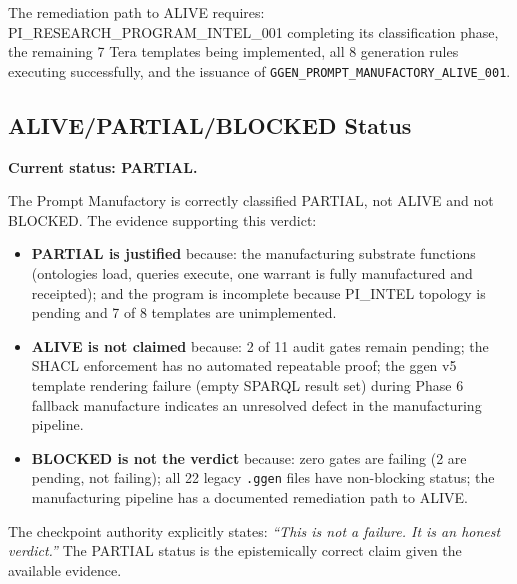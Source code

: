 The remediation path to ALIVE requires: PI\_RESEARCH\_PROGRAM\_INTEL\_001 completing
its classification phase, the remaining 7 Tera templates being implemented, all 8
generation rules executing successfully, and the issuance of
\texttt{GGEN\_PROMPT\_MANUFACTORY\_ALIVE\_001}.

\subsection{ALIVE/PARTIAL/BLOCKED Status}
\label{sec:research-prompt-manufactory-evidence-status}

\textbf{Current status: PARTIAL.}

The Prompt Manufactory is correctly classified PARTIAL, not ALIVE and not BLOCKED.
The evidence supporting this verdict:
\begin{itemize}
  \item \textbf{PARTIAL is justified} because: the manufacturing substrate functions
    (ontologies load, queries execute, one warrant is fully manufactured and receipted);
    and the program is incomplete because PI\_INTEL topology is pending and 7 of 8
    templates are unimplemented.
  \item \textbf{ALIVE is not claimed} because: 2 of 11 audit gates remain pending;
    the SHACL enforcement has no automated repeatable proof; the ggen v5 template
    rendering failure (empty SPARQL result set) during Phase 6 fallback manufacture
    indicates an unresolved defect in the manufacturing pipeline.
  \item \textbf{BLOCKED is not the verdict} because: zero gates are failing (2 are
    pending, not failing); all 22 legacy \texttt{.ggen} files have non-blocking status;
    the manufacturing pipeline has a documented remediation path to ALIVE.
\end{itemize}

The checkpoint authority explicitly states: \textit{``This is not a failure. It is an
honest verdict.''} The PARTIAL status is the epistemically correct claim given the
available evidence.
